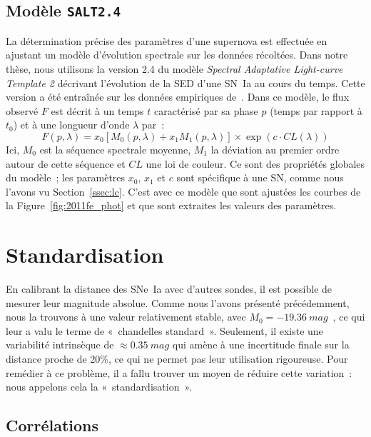 \documentclass[../main/main.tex]{subfiles}
\begin{document}
\subsection{Modèle \texttt{SALT2.4}}\label{ssec:salt}

La détermination précise des paramètres d'une supernova est effectuée en
ajustant un modèle d'évolution spectrale sur les données récoltées. Dans notre
thèse, nous utilisons la version 2.4 du modèle \textit{Spectral Adaptative
Light-curve Template 2} \citep[\texttt{SALT2},][]{guy2007} décrivant l'évolution
de la SED d'une SN~Ia au cours du temps. Cette version a été entraînée sur les
données empiriques de~\cite{betoule2014}. Dans ce modèle, le flux observé $F$
est décrit à un temps $t$ caractérisé par sa phase $p$ (temps par rapport à
$t_0$) et à une longueur d'onde $\lambda$ par~:
\begin{equation}\label{eq:saltf}
    F(p,\lambda) = x_0\left[ M_0(p,\lambda) + x_1M_1(p,\lambda)
    \right]\times \exp(c\cdot CL(\lambda))
\end{equation}
Ici, $M_0$ est la séquence spectrale moyenne, $M_1$ la déviation au premier
ordre autour de cette séquence et $CL$ une loi de couleur. Ce sont des
propriétés globales du modèle~; les paramètres $x_0$, $x_1$ et $c$ sont
spécifique à une SN, comme nous l'avons vu Section~\ref{ssec:lc}. C'est avec ce
modèle que sont ajustées les courbes de la Figure~\ref{fig:2011fe_phot} et que
sont extraites les valeurs des paramètres.

\section{Standardisation}\label{sec:stand}

En calibrant la distance des SNe~Ia avec d'autres sondes, il est possible de
mesurer leur magnitude absolue. Comme nous l'avons présenté précédemment, nous
la trouvons à une valeur relativement stable, avec $M_0 =
-\SI{19.36}{mag}$~\citep{kessler2009b}, ce qui leur a valu le terme de
«~chandelles standard~». Seulement, il existe une variabilité intrinsèque de
$\approx \SI{0.35}{mag}$ qui amène à une incertitude finale sur la distance
proche de 20\%, ce qui ne permet pas leur utilisation rigoureuse. Pour remédier
à ce problème, il a fallu trouver un moyen de réduire cette variation~: nous
appelons cela la «~standardisation~».

\subsection{Corrélations}\label{ssec:corr}
\end{document}
